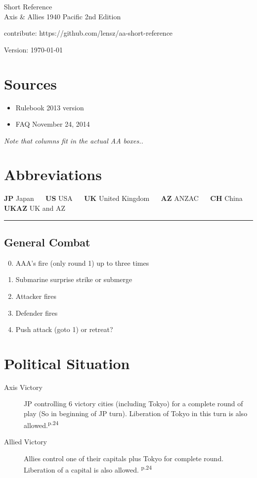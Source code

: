 \documentclass[10pt,twoside]{article}
\begin{document}
\begin{multicols*}{3}
\begin{center}
{\Large Short Reference}\\
\vspace{.2cm}
{\large Axis \& Allies 1940 Pacific 2nd Edition}

\vspace{.5cm}
contribute: https://github.com/lensz/aa-short-reference

\vspace{.5cm}
Version: \today
\end{center}

\section*{{\normalsize Sources}}
\begin{itemize}
\item Rulebook 2013 version
\item FAQ November 24, 2014
\end{itemize}

\noindent\textsl{Note that columns fit in the actual AA boxes..}

\section*{{\normalsize Abbreviations}}
\textbf{JP} Japan ~~ \textbf{US} USA ~~ \textbf{UK} United Kingdom ~~ \textbf{AZ} ANZAC ~~ \textbf{CH} China ~~ \textbf{UKAZ} UK and AZ



\noindent\rule{7.5cm}{0.4pt}

\subsection*{General Combat}
\begin{enumerate}
\setcounter{enumi}{-1}
\item AAA's fire (only round 1) up to three times
\item Submarine surprise strike or submerge
\item Attacker fires
\item Defender fires
\item Push attack (goto 1) or retreat?
\end{enumerate}

\section*{Political Situation}
\begin{description}
\item[Axis Victory] JP controlling 6 victory cities (including Tokyo) for a complete round of play (So in beginning of JP turn). Liberation of Tokyo in this turn is also allowed.\textsuperscript{p.24}
\item[Allied Victory] Allies control one of their capitals plus Tokyo for complete round. Liberation  of a capital is also allowed. \textsuperscript{p.24}
\end{description}


\end{multicols*}
\end{document}
